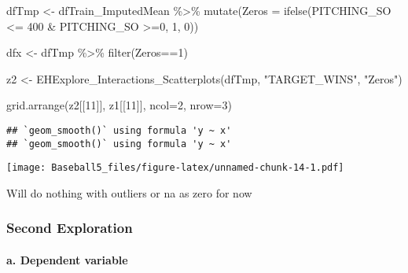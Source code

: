 \documentclass[
]{article}
\newenvironment{Shaded}{\begin{snugshade}}{\end{snugshade}}
\newcommand{\AttributeTok}[1]{\textcolor[rgb]{0.77,0.63,0.00}{#1}}
\newcommand{\DecValTok}[1]{\textcolor[rgb]{0.00,0.00,0.81}{#1}}
\newcommand{\FunctionTok}[1]{\textcolor[rgb]{0.00,0.00,0.00}{#1}}
\newcommand{\NormalTok}[1]{#1}
\newcommand{\OtherTok}[1]{\textcolor[rgb]{0.56,0.35,0.01}{#1}}
\newcommand{\SpecialCharTok}[1]{\textcolor[rgb]{0.00,0.00,0.00}{#1}}
\newcommand{\StringTok}[1]{\textcolor[rgb]{0.31,0.60,0.02}{#1}}
\begin{document}
\begin{Shaded}
\begin{Highlighting}[]
\NormalTok{dfTmp }\OtherTok{\textless{}{-}}\NormalTok{ dfTrain\_ImputedMean }\SpecialCharTok{\%\textgreater{}\%}
  \FunctionTok{mutate}\NormalTok{(}\AttributeTok{Zeros =} \FunctionTok{ifelse}\NormalTok{(PITCHING\_SO }\SpecialCharTok{\textless{}=} \DecValTok{400} \SpecialCharTok{\&}\NormalTok{ PITCHING\_SO }\SpecialCharTok{\textgreater{}=}\DecValTok{0}\NormalTok{, }\DecValTok{1}\NormalTok{, }\DecValTok{0}\NormalTok{))}

\NormalTok{dfx }\OtherTok{\textless{}{-}}\NormalTok{ dfTmp }\SpecialCharTok{\%\textgreater{}\%}
  \FunctionTok{filter}\NormalTok{(Zeros}\SpecialCharTok{==}\DecValTok{1}\NormalTok{)}

\NormalTok{z2 }\OtherTok{\textless{}{-}} \FunctionTok{EHExplore\_Interactions\_Scatterplots}\NormalTok{(dfTmp, }\StringTok{"TARGET\_WINS"}\NormalTok{, }\StringTok{"Zeros"}\NormalTok{)}

\FunctionTok{grid.arrange}\NormalTok{(z2[[}\DecValTok{11}\NormalTok{]], z1[[}\DecValTok{11}\NormalTok{]],  }\AttributeTok{ncol=}\DecValTok{2}\NormalTok{, }\AttributeTok{nrow=}\DecValTok{3}\NormalTok{)}
\end{Highlighting}
\end{Shaded}

\begin{verbatim}
## `geom_smooth()` using formula 'y ~ x'
## `geom_smooth()` using formula 'y ~ x'
\end{verbatim}

\texttt{[image: Baseball5\_files/figure-latex/unnamed-chunk-14-1.pdf]}

Will do nothing with outliers or na as zero for now

\hypertarget{second-exploration}{%
\subsubsection{Second Exploration}\label{second-exploration}}

\hypertarget{a.-dependent-variable}{%
\paragraph{a. Dependent variable}\label{a.-dependent-variable}}

\begin{Shaded}
\end{Shaded}
\end{document}

